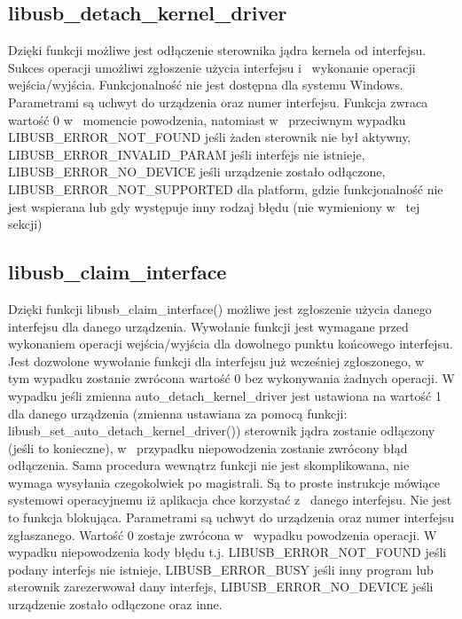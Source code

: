 \documentclass{BscUS}
\begin{document}
\subsection{libusb\_detach\_kernel\_driver}
\indent Dzięki funkcji możliwe jest odłączenie sterownika jądra kernela od interfejsu.
Sukces operacji umożliwi zgłoszenie użycia interfejsu i~ wykonanie operacji wejścia/wyjścia.
Funkcjonalność nie jest dostępna dla systemu Windows.
Parametrami są uchwyt do urządzenia oraz numer interfejsu.
Funkcja zwraca wartość 0 w~ momencie powodzenia, natomiast w~ przeciwnym wypadku LIBUSB\_ERROR\_NOT\_FOUND jeśli żaden sterownik nie był aktywny, LIBUSB\_ERROR\_INVALID\_PARAM jeśli interfejs nie istnieje, LIBUSB\_ERROR\_NO\_DEVICE jeśli urządzenie zostało odłączone, LIBUSB\_ERROR\_NOT\_SUPPORTED dla platform, gdzie funkcjonalność nie jest wspierana lub gdy występuje inny rodzaj błędu (nie wymieniony w~ tej sekcji)
\subsection{libusb\_claim\_interface}
\indent Dzięki funkcji libusb\_claim\_interface() możliwe jest zgłoszenie użycia danego interfejsu dla danego urządzenia.
Wywołanie funkcji jest wymagane przed wykonaniem operacji wejścia/wyjścia dla dowolnego punktu końcowego interfejsu.
Jest dozwolone wywołanie funkcji dla interfejsu już wcześniej zgłoszonego, w~ tym wypadku zostanie zwrócona wartość 0 bez wykonywania żadnych operacji.
W wypadku jeśli zmienna auto\_detach\_kernel\_driver jest ustawiona na wartość 1 dla danego urządzenia (zmienna ustawiana za pomocą funkcji: libusb\_set\_auto\_detach\_kernel\_driver()) sterownik jądra zostanie odłączony (jeśli to konieczne), w~ przypadku niepowodzenia zostanie zwrócony błąd odłączenia.
Sama procedura wewnątrz funkcji nie jest skomplikowana, nie wymaga wysyłania czegokolwiek po magistrali. Są to proste instrukcje mówiące systemowi operacyjnemu iż aplikacja chce korzystać z~ danego interfejsu.
Nie jest to funkcja blokująca.
Parametrami są uchwyt do urządzenia oraz numer interfejsu zgłaszanego.
Wartość 0 zostaje zwrócona w~ wypadku powodzenia operacji.
W wypadku niepowodzenia kody błędu t.j. LIBUSB\_ERROR\_NOT\_FOUND jeśli podany interfejs nie istnieje, LIBUSB\_ERROR\_BUSY jeśli inny program lub sterownik zarezerwował dany interfejs, LIBUSB\_ERROR\_NO\_DEVICE jeśli urządzenie zostało odłączone oraz inne.
\end{document}
